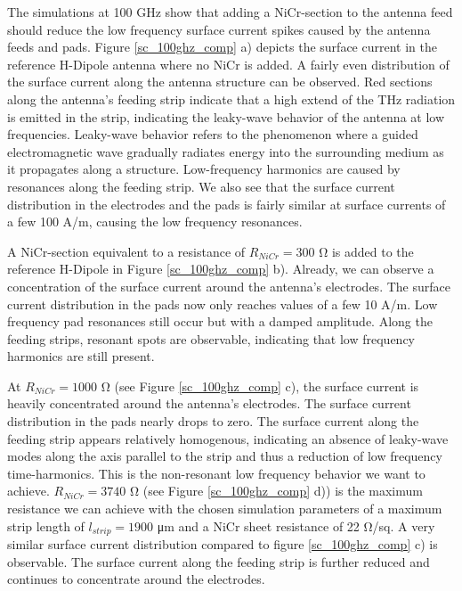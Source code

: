  The simulations at \num{100} \si{\giga \hertz} show that adding a NiCr-section to the antenna feed should reduce the low frequency surface current spikes caused by the antenna feeds and pads.
Figure \ref{sc_100ghz_comp} a) depicts the surface current in the reference H-Dipole antenna where no NiCr is added. A fairly even distribution of the surface current along the antenna structure can be observed. Red sections along the antenna's feeding strip indicate that a high extend of the THz radiation is emitted in the strip, indicating the leaky-wave behavior of the antenna at low frequencies. Leaky-wave behavior refers to the phenomenon where a guided electromagnetic wave gradually radiates energy into the surrounding medium as it propagates along a structure. Low-frequency harmonics are caused by  resonances along the feeding strip. We also see that the surface current distribution in the electrodes and the pads is fairly similar at surface currents of a few \num{100} \si{\ampere/\meter}, causing the low frequency resonances. 

A NiCr-section equivalent to a resistance of $R_{NiCr} = 300$ \si{\ohm} is added to the reference H-Dipole in Figure \ref{sc_100ghz_comp} b). Already, we can observe a concentration of the surface current around the antenna's electrodes. The surface current distribution in the pads now only reaches values of a few \num{10} \si{\ampere/\meter}. Low frequency pad resonances still occur but with a damped amplitude. Along the feeding strips, resonant spots are observable, indicating that low frequency harmonics are still present. 

At $R_{NiCr} = 1000$ \si{\ohm} (see Figure \ref{sc_100ghz_comp} c), the surface current is heavily concentrated around the antenna's electrodes. The surface current distribution in the pads nearly drops to zero. The surface current along the feeding strip appears relatively homogenous, indicating an absence of leaky-wave modes along the axis parallel to the strip and thus a reduction of low frequency time-harmonics. This is the non-resonant low frequency behavior we want to achieve. $R_{NiCr} = 3740$ \si{\ohm} (see Figure \ref{sc_100ghz_comp} d)) is the maximum resistance we can achieve with the chosen simulation parameters of a maximum strip length of $l_{strip} = 1900$ \si{\micro \meter} and a NiCr sheet resistance of \num{22} \si{\ohm/sq}. A very similar surface current distribution compared to figure \ref{sc_100ghz_comp} c) is observable. The surface current along the feeding strip is further reduced and continues to concentrate around the electrodes. 

